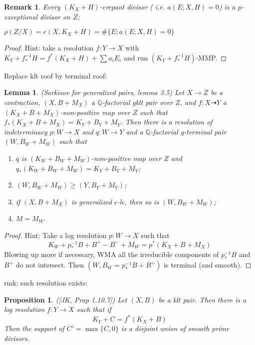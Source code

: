 \documentclass{article}
\newtheorem{prop}[defn]{Proposition}
\newtheorem{lem}[defn]{Lemma}
\newtheorem{rmk}[defn]{Remark}
\begin{document}
\begin{rmk}
  Every $ (K_X+H) $-crepant divisor ( i.e. $ a(E;X,H)=0 $)  is a $ p $-exceptional divisor on $ Z $;
  
  $ \rho(Z/X)=e(X,K_X+H)=\#\{E;a(E;X,H)=0\} $
\end{rmk}

\begin{proof}
  Hint: take a resolution $ f:Y\to X $ with $ K_Y+f^{-1}_*H=f^*(K_X+H)+\sum a_iE_i $ and run $ (K_Y+f^{-1}_*H) $-MMP.
\end{proof}


Replace klt roof by terminal roof:
\begin{lem}
  (Sarkisov for generalized pairs, lemma 3.5) Let $ X\to Z $ be a contraction, $ (X,B+M_X) $ a $ \mathbb{Q} $-factorial gklt pair over $ Z $, and $ f:X\dashrightarrow Y $ a $ (K_X+B+M_X) $-non-positive map over $ Z $ such that $ f_*(K_X+B+M_X)=K_Y+B_Y+M_Y $. Then there is a resolution of indeterminacy $ p:W\to X $ and $ q:W\to Y $ and a $ \mathbb{Q} $-factorial g-terminal pair $ (W,B_W+M_W) $ such that
  \begin{enumerate}
    \item $ q $ is $ (K_W+B_W+M_W) $-non-positive map over $ Z $ and $ q_*(K_W+B_W+M_W)=K_Y+B_Y+M_Y $;
    \item $ (W,B_W+M_W)\geqslant (Y,B_Y+M_Y) $;
    \item if $ (X,B+M_X) $ is generalized $ \epsilon $-lc, then so is $ (W,B_W+M_W) $;
    \item $ M=M_W $.
  \end{enumerate} 
\end{lem}
\begin{proof}
  Hint: Take a log resolution $ p:W\to X $ such that 
  $$ K_W+p^{-1}_*B+B^+-B^-+M_W=p^*(K_X+B+M_X) $$
  Blowing up more if necessary, WMA all the irreducible components of $ p^{-1}_*B $ and $ B^+ $ do not intersect. Then $ (W,B_W= p^{-1}_*B+B^+) $ is terminal (and smooth).
\end{proof}
rmk: such resolution exists:
\begin{prop}
  ([JK, Prop 1.10.7]) Let $ (X,B) $ be a klt pair. Then there is a log resolution $ f:Y\to X $ such that if 
  $$ K_Y+C=f^*(K_X+B) $$
  Then the support of $ C'=\max \{C,0\} $ is a disjoint union of smooth prime divisors.
\end{prop}
\end{document}

